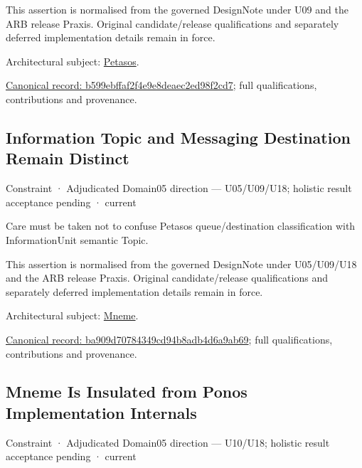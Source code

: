 This assertion is normalised from the governed DesignNote under U09 and the ARB release Praxis. Original candidate/release qualifications and separately deferred implementation details remain in force.



Architectural subject: \hyperref[element:195e5f10db8e419391354197b5d7a8cc]{Petasos}.


{\footnotesize \href{../../../../continuum/motivation/constraint/b599ebffaf2f4e9e8deaec2ed98f2cd7.md}{Canonical record: b599ebffaf2f4e9e8deaec2ed98f2cd7}; full qualifications, contributions and provenance.}\par
\subsection{Information Topic and Messaging Destination Remain Distinct}

\label{element:ba909d70784349cd94b8adb4d6a9ab69}
{\small Constraint · Adjudicated Domain05 direction — U05/U09/U18; holistic result acceptance pending · current}\par

Care must be taken not to confuse Petasos queue/destination classification with InformationUnit semantic Topic.



This assertion is normalised from the governed DesignNote under U05/U09/U18 and the ARB release Praxis. Original candidate/release qualifications and separately deferred implementation details remain in force.



Architectural subject: \hyperref[element:1af8a56358f7429fabfb57be66542a99]{Mneme}.


{\footnotesize \href{../../../../continuum/motivation/constraint/ba909d70784349cd94b8adb4d6a9ab69.md}{Canonical record: ba909d70784349cd94b8adb4d6a9ab69}; full qualifications, contributions and provenance.}\par
\subsection{Mneme Is Insulated from Ponos Implementation Internals}

\label{element:c30ae90fc19b465982b28d61ac1edca5}
{\small Constraint · Adjudicated Domain05 direction — U10/U18; holistic result acceptance pending · current}\par

